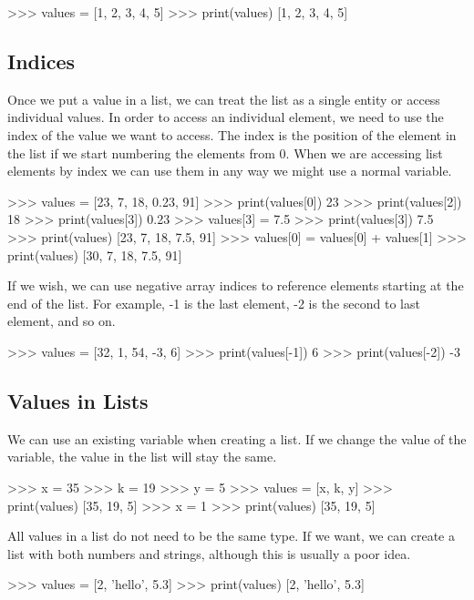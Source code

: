 \documentclass[11pt]{cselabheader}
\begin{document}
\begin{pyconcode}
>>> values = [1, 2, 3, 4, 5]
>>> print(values)
[1, 2, 3, 4, 5]
\end{pyconcode}

\subsection{Indices}
Once we put a value in a list, we can treat the list as a single entity or
access individual values. In order to access an individual element, we need to
use the index of the value we want to access. The index is the position of the
element in the list if we start numbering the elements from 0. When we are
accessing list elements by index we can use them in any way we might use a
normal variable.

\begin{pyconcode}
>>> values = [23, 7, 18, 0.23, 91]
>>> print(values[0])
23
>>> print(values[2])
18
>>> print(values[3])
0.23
>>> values[3] = 7.5
>>> print(values[3])
7.5
>>> print(values)
[23, 7, 18, 7.5, 91]
>>> values[0] = values[0] + values[1]
>>> print(values)
[30, 7, 18, 7.5, 91]
\end{pyconcode}

If we wish, we can use negative array indices to reference elements starting at
the end of the list. For example, -1 is the last element, -2 is the second to
last element, and so on.

\begin{pyconcode}
>>> values = [32, 1, 54, -3, 6]
>>> print(values[-1])
6
>>> print(values[-2])
-3
\end{pyconcode}

\subsection{Values in Lists}
We can use an existing variable when creating a list. If we change the value of
the variable, the value in the list will stay the same.

\begin{pyconcode}
>>> x = 35
>>> k = 19
>>> y = 5
>>> values = [x, k, y]
>>> print(values)
[35, 19, 5]
>>> x = 1
>>> print(values)
[35, 19, 5]
\end{pyconcode}

All values in a list do not need to be the same type. If we want, we can create
a list with both numbers and strings, although this is usually a poor idea.

\begin{pyconcode}
>>> values = [2, 'hello', 5.3]
>>> print(values)
[2, 'hello', 5.3]
\end{pyconcode}
\end{document}
